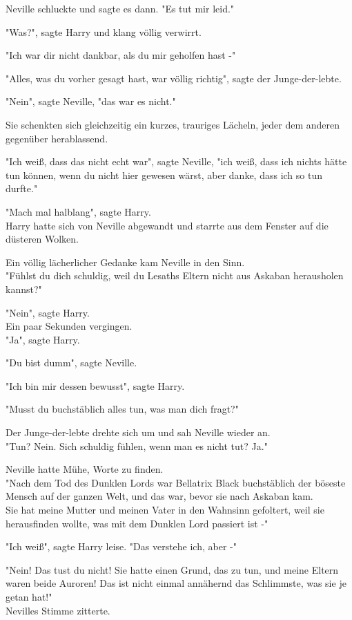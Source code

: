 {Neville schluckte und sagte es dann. "Es tut mir leid."

"Was?", sagte Harry und klang völlig verwirrt.

"Ich war dir nicht dankbar, als du mir geholfen hast -"

"Alles, was du vorher gesagt hast, war völlig richtig", sagte der Junge-der-lebte.

"Nein", sagte Neville, "das war es nicht."

Sie schenkten sich gleichzeitig ein kurzes, trauriges Lächeln, jeder dem anderen gegenüber herablassend.

"Ich weiß, dass das nicht echt war", sagte Neville, "ich weiß, dass ich nichts hätte tun können, wenn du nicht hier gewesen wärst, aber danke, dass ich so tun durfte."

"Mach mal halblang", sagte Harry.\\ Harry hatte sich von Neville abgewandt und starrte aus dem Fenster auf die düsteren Wolken.

Ein völlig lächerlicher Gedanke kam Neville in den Sinn.\\ "Fühlst du dich schuldig, weil du Lesaths Eltern nicht aus Askaban herausholen kannst?"

"Nein", sagte Harry.\\ Ein paar Sekunden vergingen.\\ "Ja", sagte Harry.

"Du bist dumm", sagte Neville.

"Ich bin mir dessen bewusst", sagte Harry.

"Musst du buchstäblich alles tun, was man dich fragt?"

Der Junge-der-lebte drehte sich um und sah Neville wieder an.\\ "Tun? Nein. Sich schuldig fühlen, wenn man es nicht tut? Ja."

Neville hatte Mühe, Worte zu finden.\\ "Nach dem Tod des Dunklen Lords war Bellatrix Black buchstäblich der böseste Mensch auf der ganzen Welt, und das war, bevor sie nach Askaban kam.\\ Sie hat meine Mutter und meinen Vater in den Wahnsinn gefoltert, weil sie herausfinden wollte, was mit dem Dunklen Lord passiert ist -"

"Ich weiß", sagte Harry leise. "Das verstehe ich, aber -"

"Nein! Das tust du nicht! Sie hatte einen Grund, das zu tun, und meine Eltern waren beide Auroren! Das ist nicht einmal annähernd das Schlimmste, was sie je getan hat!"\\ Nevilles Stimme zitterte.

}
